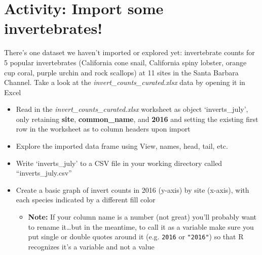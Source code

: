 \documentclass[]{book}
\providecommand{\tightlist}{%
  \setlength{\itemsep}{0pt}\setlength{\parskip}{0pt}}
\begin{document}
\hypertarget{activity-import-some-invertebrates}{%
\section{Activity: Import some invertebrates!}\label{activity-import-some-invertebrates}}

There's one dataset we haven't imported or explored yet: invertebrate counts for 5 popular invertebrates (California cone snail, California spiny lobster, orange cup coral, purple urchin and rock scallops) at 11 sites in the Santa Barbara Channel. Take a look at the \emph{invert\_counts\_curated.xlsx} data by opening it in Excel

\begin{itemize}
\tightlist
\item
  Read in the \emph{invert\_counts\_curated.xlsx} worksheet as object `inverts\_july', only retaining \textbf{site}, \textbf{common\_name}, and \textbf{2016} and setting the existing first row in the worksheet as to column headers upon import
\item
  Explore the imported data frame using View, names, head, tail, etc.
\item
  Write `inverts\_july' to a CSV file in your working directory called ``inverts\_july.csv''
\item
  Create a basic graph of invert counts in 2016 (y-axis) by site (x-axis), with each species indicated by a different fill color

  \begin{itemize}
  \tightlist
  \item
    \textbf{Note:} If your column name is a number (not great) you'll probably want to rename it\ldots{}but in the meantime, to call it as a variable make sure you put single or double quotes around it (e.g. \texttt{\textquotesingle{}2016\textquotesingle{}} or \texttt{"2016"}) so that R recognizes it's a variable and not a value
  \end{itemize}
\end{itemize}
\end{document}
